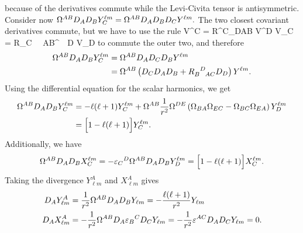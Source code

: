 \documentclass{article}
\begin{document}
because of the derivatives commute while the Levi-Civita tensor is 
antisymmetric. 
Consider now $ \Omega^{AB} D_{A} D_{B} Y_{C}^{\ell m} 
 = \Omega^{AB} D_{A} D_{B} D_{C} Y^{\ell m}. $
The two closest covariant derivatives commute, but we have to use the rule
\be
 \left[ D_{A}, D_{B} \right] V^{C} = {R^{C}}_{DAB} V^{D} 
 \q \q
 \Rightarrow
 \q \q
 \left[ D_{A}, D_{B} \right] V_{C} =  R_{C \ \ AB}^{\ \ D} V_{D}  
\ee
to commute the outer two, and therefore
\begin{align}
\Omega^{AB} D_{A} D_{B} Y_{C}^{\ell m} & = \Omega^{AB} D_{A} D_{C} D_{B} Y^{\ell m} \\
&= \Omega^{AB} \left( D_{C} D_{A} D_{B} + R_{B \ \ AC}^{\ \ D} D_{D} \right) Y^{\ell m}.
\end{align}
Using the differential equation for the scalar harmonics, we get
\begin{align}
\Omega^{AB} D_{A} D_{B} Y_{C}^{\ell m} &=
- \ell (\ell+1) Y^{\ell m}_{C} 
+ \Omega^{AB} \frac{1}{r^{2}} \Omega^{DE}
\left( \Omega_{BA} \Omega_{EC} - \Omega_{BC} \Omega_{EA} \right) Y_{D}^{\ell m} \\
&= \Big[ 1 - \ell (\ell+1) \Big] Y^{\ell m}_{C}.
\end{align}
Additionally, we have
\begin{align}
\Omega^{AB} D_{A} D_{B} X_{C}^{\ell m} = 
- {\varepsilon_{C}}^{D} \Omega^{AB} D_{A} D_{B} Y_{D}^{\ell m}
= \Big[ 1 - \ell (\ell+1) \Big] X^{\ell m}_{C}.
\end{align}
Taking the divergence $Y_{\ell m}^{A}$  and $X_{\ell m}^{A}$ gives
\begin{align}
D_{A} Y_{\ell m}^{A} &= \frac{1}{r^{2}} \Omega^{AB} D_{A} D_{B} Y_{\ell m} 
= - \frac{\ell (\ell+1)}{r^{2}} Y_{\ell m} \\
D_{A} X_{\ell m}^{A} &= - \frac{1}{r^{2}} \Omega^{AB} D_{A} {\varepsilon_{B}}^{C} D_{C} Y_{\ell m} 
= - \frac{1}{r^{2}} \varepsilon^{AC} D_{A} D_{C} Y_{\ell m}  = 0.
\end{align}
\end{document}
